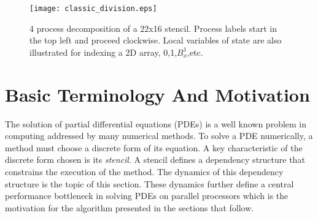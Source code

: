 
\newcommand{\nxl}{\textup{\textsf{nxl}}} %
\newcommand{\nyl}{\textup{\textsf{nyl}}} %
\newcommand{\tm}{ \text{$t_{max}$} }
\newcommand{\av}{ \mathbf{a} }
\newcommand{\uv}{ \mathbf{u} }
\newcommand{\bv}{ \mathbf{b} }
\newcommand{\pv}{ \mathbf{p} }
\newcommand{\orig} {\mathcal{O}}

\newcommand{\rnt}{ R_{-\theta} }
\newcommand{\rt}{ R_{\theta} }

\newcommand{\la}{\leftarrow} %
\newcommand{\ra}{\rightarrow} %

\newcommand{\dx}{\textsf{dx}}
\newcommand{\dy}{\textsf{dy}}

\newcommand{\data}{\textup{\textsf{data}}}
\newcommand{\psendf}{\textit{postSend}}
\newcommand{\precvf}{\textit{postRecv}}
\newcommand{\psend}[2]{\psendf(#1,#2)}
\newcommand{\precv}[2]{\precvf(#1,#2)}
\newcommand{\pid}{\textup{\textsf{pid}}} %


\begin{figure}[t]
  \centering
  \texttt{[image: classic\_division.eps]}
  \caption{4 process decomposition of a 22x16 stencil.  Process labels start in the top left and proceed clockwise.  Local
  variables of state are also illustrated for indexing a 2D array, 0,1,$B_x^1$,etc.}
  \label{fig:basic}
\end{figure}

\section{Basic Terminology And Motivation}\label{sec:problem_statement}
The solution of partial differential equations (PDEs)
is a well known problem in computing addressed by many
numerical methods.
To solve a PDE numerically, a method must choose a discrete
form of its equation.
A key characteristic of the discrete form chosen is its
 {\it stencil}.
A stencil
 defines a dependency structure that constrains
the execution of the method.  The dynamics
of this dependency structure is the topic of this section.
These dynamics further define a central performance bottleneck in
solving PDEs on parallel processors which is the motivation
for the algorithm
presented in the sections that follow.

